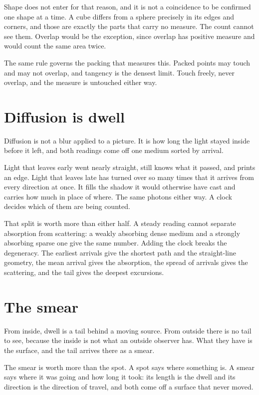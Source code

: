 Shape does not enter for that reason, and it is not a coincidence to be confirmed one shape at a time. A cube differs from a sphere precisely in its edges and corners, and those are exactly the parts that carry no measure. The count cannot see them. Overlap would be the exception, since overlap has positive measure and would count the same area twice.

The same rule governs the packing that measures this. Packed points may touch and may not overlap, and tangency is the densest limit. Touch freely, never overlap, and the measure is untouched either way.

\section{Diffusion is dwell}

Diffusion is not a blur applied to a picture. It is how long the light stayed inside before it left, and both readings come off one medium sorted by arrival.

Light that leaves early went nearly straight, still knows what it passed, and prints an edge. Light that leaves late has turned over so many times that it arrives from every direction at once. It fills the shadow it would otherwise have cast and carries how much in place of where. The same photons either way. A clock decides which of them are being counted.

That split is worth more than either half. A steady reading cannot separate absorption from scattering: a weakly absorbing dense medium and a strongly absorbing sparse one give the same number. Adding the clock breaks the degeneracy. The earliest arrivals give the shortest path and the straight-line geometry, the mean arrival gives the absorption, the spread of arrivals gives the scattering, and the tail gives the deepest excursions.

\section{The smear}

From inside, dwell is a tail behind a moving source. From outside there is no tail to see, because the inside is not what an outside observer has. What they have is the surface, and the tail arrives there as a smear.

The smear is worth more than the spot. A spot says where something is. A smear says where it was going and how long it took: its length is the dwell and its direction is the direction of travel, and both come off a surface that never moved.

